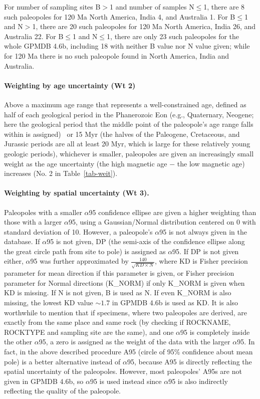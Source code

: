 For number of sampling sites B$>$1 and number of samples N$\leq$1, there are 8
such paleopoles for 120 Ma North America, India 4, and Australia 1.
For B$\leq$1 and N$>$1, there are 20 such paleopoles for 120 Ma
North America, India 26, and Australia 22. For B$\leq$1 and N$\leq$1, there are
only 23 such paleopoles for the whole GPMDB 4.6b, including 18 with neither B
value nor N value given; while for 120 Ma there is no such paleopole
found in North America, India and Australia.

\paragraph{Weighting by age uncertainty (Wt 2)} Above a maximum age range
that represents a well-constrained age, defined as half of each geological
period in the Phanerozoic Eon (e.g., Quaternary, Neogene; here the geological
period that the middle point of the paleopole's age range falls within is
assigned)~\citep{v90,T19} or 15 Myr (the halves of the Paleogene, Cretaceous,
and Jurassic periods are all at least 20 Myr, which is large for these
relatively young geologic periods), whichever is smaller, paleopoles are given
an increasingly small weight as the age uncertainty (the high magnetic age $-$
the low magnetic age) increases (No. 2 in Table~\ref{tab-weit}).

\paragraph{Weighting by spatial uncertainty (Wt 3).} Paleopoles with a
smaller $\alpha$95 confidence ellipse are given a higher weighting than those
with a larger $\alpha$95, using a Gaussian/Normal distribution centered on 0
with standard deviation of 10. However, a paleopole's $\alpha$95 is not always
given in the database. If $\alpha$95 is not given, DP (the semi-axis of the
confidence ellipse along the great circle path from site to pole) is assigned as
$\alpha$95. If DP is not given either, $\alpha$95 was further approximated by
$\frac{140}{\sqrt{KD\times{}N}}$, where KD is Fisher precision parameter for
mean direction if this parameter is given, or Fisher precision parameter for
Normal directions (K\_NORM) if only K\_NORM is given when KD is missing. If N is
not given, B is used as N. If even K\_NORM is also missing, the lowest KD value
${\sim}1.7$ in GPMDB 4.6b is used as KD\@. It is also worthwhile to mention that
if specimens, where two paleopoles are derived, are exactly from the same place
and same rock (by checking if ROCKNAME, ROCKTYPE and sampling site are the
same), and one $\alpha$95 is completely inside the other $\alpha$95, a zero is
assigned as the weight of the data with the larger $\alpha$95. In fact, in the
above described procedure A95 (circle of 95\% confidence about mean pole) is a
better alternative instead of $\alpha$95, because A95 is directly reflecting the
spatial uncertainty of the paleopoles. However, most paleopoles' A95s are not
given in GPMDB 4.6b, so $\alpha$95 is used instead since $\alpha$95 is also
indirectly reflecting the quality of the paleopole.


